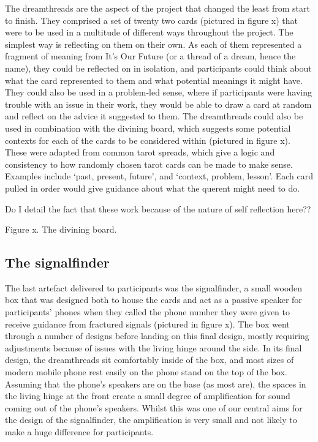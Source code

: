 The dreamthreads are the aspect of the project that changed the least from start to finish. They comprised a set of twenty two cards (pictured in figure x) that were to be used in a multitude of different ways throughout the project. The simplest way is reflecting on them on their own. As each of them represented a fragment of meaning from It’s Our Future (or a thread of a dream, hence the name), they could be reflected on in isolation, and participants could think about what the card represented to them and what potential meanings it might have. They could also be used in a problem-led sense, where if participants were having trouble with an issue in their work, they would be able to draw a card at random and reflect on the advice it suggested to them.
	The dreamthreads could also be used in combination with the divining board, which suggests some potential contexts for each of the cards to be considered within (pictured in figure x). These were adapted from common tarot spreads, which give a logic and consistency to how randomly chosen tarot cards can be made to make sense. Examples include ‘past, present, future’, and ‘context, problem, lesson’. Each card pulled in order would give guidance about what the querent might need to do. 

Do I detail the fact that these work because of the nature of self reflection here??

Figure x. The divining board.

\subsection{The signalfinder}

The last artefact delivered to participants was the signalfinder, a small wooden box that was designed both to house the cards and act as a passive speaker for participants’ phones when they called the phone number they were given to receive guidance from fractured signals (pictured in figure x). The box went through a number of designs before landing on this final design, mostly requiring adjustments because of issues with the living hinge around the side. In its final design, the dreamthreads sit comfortably inside of the box, and most sizes of modern mobile phone rest easily on the phone stand on the top of the box. Assuming that the phone’s speakers are on the base (as most are), the spaces in the living hinge at the front create a small degree of amplification for sound coming out of the phone’s speakers. Whilst this was one of our central aims for the design of the signalfinder, the amplification is very small and not likely to make a huge difference for participants. 

